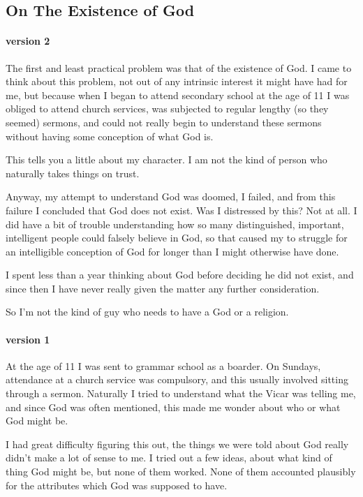 
\subsection{On The Existence of God}

\paragraph{version 2}

The first and least practical problem was that of the existence of God.
I came to think about this problem, not out of any intrinsic interest it might have had for me, but because when I began to attend secondary school at the age of 11 I was obliged to attend church services, was subjected to regular lengthy (so they seemed) sermons, and could not really begin to understand these sermons without having some conception of what God is.

This tells you a little about my character.
I am not the kind of person who naturally takes things on trust.

Anyway, my attempt to understand God was doomed, I failed, and from this failure I concluded that God does not exist.
Was I distressed by this?
Not at all.
I did have a bit of trouble understanding how so many distinguished, important, intelligent people could falsely believe in God, so that caused my to struggle for an intelligible conception of God for longer than I might otherwise have done.

I spent less than a year thinking about God before deciding he did not exist, and since then I have never really given the matter any further consideration.

So I'm not the kind of guy who needs to have a God or a religion.

\paragraph{version 1}

At the age of 11 I was sent to grammar school as a boarder.
On Sundays, attendance at a church service was compulsory, and this usually involved sitting through a sermon.
Naturally I tried to understand what the Vicar was telling me, and since God was often mentioned, this made me wonder about who or what God might be.

I had great difficulty figuring this out, the things we were told about God really didn't make a lot of sense to me.
I tried out a few ideas, about what kind of thing God might be, but none of them worked.
None of them accounted plausibly for the attributes which God was supposed to have.

